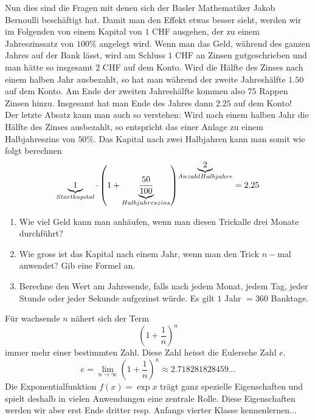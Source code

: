 \documentclass[11pt,oneside]{article}
\begin{document}
	Nun dies sind die Fragen mit denen sich der Basler Mathematiker Jakob Bernoulli beschäftigt hat. Damit man den Effekt etwas besser sieht, werden wir im Folgenden von einem Kapital von $1$ CHF ausgehen, der zu einem Jahreszinssatz von $100\%$ angelegt wird. Wenn man das Geld, während des ganzen Jahres auf der Bank lässt, wird am Schluss $1$ CHF an Zinsen gutgeschrieben und man hätte so insgesamt $2$ CHF auf dem Konto.
	Wird die Hälfte des Zinses nach einem halben Jahr ausbezahlt, so hat man während der zweite Jahreshälfte $1.50$ auf dem Konto. Am Ende der zweiten Jahreshälfte kommen also $75$ Rappen Zinsen hinzu. Insgesamt hat man Ende des Jahres dann $2.25$ auf dem Konto!\\
	Der letzte Absatz kann man auch so verstehen: Wird nach einem halben Jahr die Hälfte des Zinses ausbezahlt, so entspricht das einer Anlage zu einem Halbjahreszins von $50\%$. Das Kapital nach zwei Halbjahren kann man somit wie folgt berechnen
	\[\underbrace{1}_{\substack{Startkapital}}\cdot \left(1+\underbrace{\frac{50}{100}}_{\substack{Halbjahreszins}}\right)^{\underbrace{2}_{\substack{Anzahl Halbjahre}}}=2.25\]
	\begin{enumerate}
		\item Wie viel Geld kann man anhäufen, wenn man diesen \glqq Trick\grqq\:alle drei Monate durchführt?\vspace{5pt}\\
		\item Wie gross ist das Kapital nach einem Jahr, wenn man den \glqq Trick\grqq\: $n-$mal anwendet? Gib eine Formel an.\vspace{5pt}\\
		\item Berechne den Wert am Jahresende, falls nach jedem Monat, jedem Tag, jeder Stunde oder jeder Sekunde aufgezinst würde. Es gilt $1$ Jahr $ = 360$ Banktage.\vspace{5pt}\\
	\end{enumerate}
	\begin{definition}
		Für wachsende $n$ nähert sich der Term \[\left(1+\frac{1}{n}\right)^n\] immer mehr einer bestimmten Zahl. Diese Zahl heisst die Eulersche Zahl $e$. \[e=\lim_{n\rightarrow\infty}\left(1+\frac{1}{n}\right)^n\approx2.718281828459...\]
		Die Exponentialfunktion $f(x)=\exp{x}$ trägt ganz spezielle Eigenschaften und spielt deshalb in vielen Anwendungen eine zentrale Rolle. Diese Eigenschaften werden wir aber erst Ende dritter resp. Anfangs vierter Klasse kennenlernen...
	\end{definition}
\end{document}
